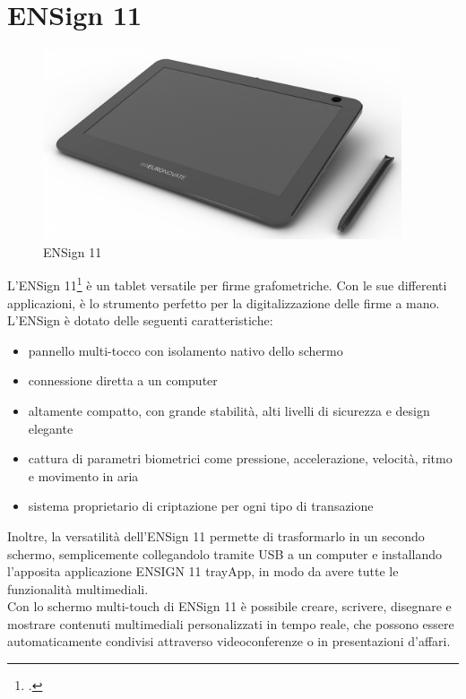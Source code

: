 \section{ENSign 11}

\begin{figure}[!h] 
    \centering 
    \includegraphics[width=300pt]{images/ensign11.png} 
    \caption{ENSign 11}
    \label{fig:ens11}
\end{figure}

L'ENSign 11\footcite{site:ensign11} è un tablet versatile per firme grafometriche. Con le sue differenti applicazioni, è lo strumento perfetto per la digitalizzazione delle firme a mano.\\
L'ENSign è dotato delle seguenti caratteristiche:
\begin{itemize}
    \item pannello multi-tocco con isolamento nativo dello schermo
    \item connessione diretta a un computer
    \item altamente compatto, con grande stabilità, alti livelli di sicurezza e design elegante
    \item cattura di parametri biometrici come pressione, accelerazione, velocità, ritmo e movimento in aria
    \item sistema proprietario di criptazione per ogni tipo di transazione
\end{itemize}
Inoltre, la versatilità dell'ENSign 11 permette di trasformarlo in un secondo schermo, semplicemente collegandolo tramite USB a un computer e installando l'apposita applicazione ENSIGN 11 trayApp, in modo da avere tutte le funzionalità multimediali.\\
Con lo schermo multi-touch di ENSign 11 è possibile creare, scrivere, disegnare e mostrare contenuti multimediali personalizzati in tempo reale, che possono essere automaticamente condivisi attraverso videoconferenze o in presentazioni d'affari.

